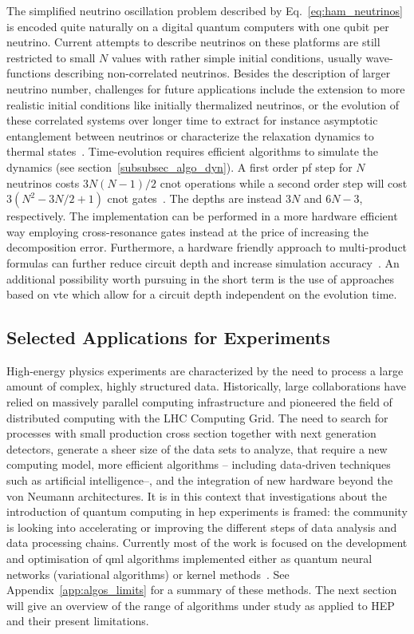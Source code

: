 The simplified neutrino oscillation problem described by Eq.~\eqref{eq:ham_neutrinos} is encoded quite naturally on a digital quantum computers with one qubit per neutrino. Current attempts to describe neutrinos on these platforms are still restricted to small $N$ values with rather simple initial conditions, usually wave-functions describing non-correlated neutrinos. Besides the description of larger neutrino number, challenges for future applications include the extension to more realistic initial conditions like initially thermalized neutrinos, or the evolution of these correlated systems over longer time to extract for instance asymptotic entanglement between neutrinos or characterize the relaxation dynamics to thermal states~\cite{Martin2023}. Time-evolution requires efficient algorithms to simulate the dynamics (see section~\ref{subsubsec_algo_dyn}). A first order \gls{pf} step for $N$ neutrinos costs $3N(N-1)/2$ \gls{cnot} operations while a second order step will cost $3(N^2-3N/2+1)$ \gls{cnot} gates~\cite{Amitrano2022}. The depths are instead $3N$ and $6N-3$, respectively. The implementation can be performed in a more hardware efficient way employing cross-resonance gates instead at the price of increasing the decomposition error. 
Furthermore, a hardware friendly approach to multi-product formulas can further reduce circuit depth and increase simulation accuracy~\cite{Vazquez2022}.
An additional possibility worth pursuing in the short term is the use of approaches based on \gls{vte} which allow for a circuit depth independent on the evolution time.

\subsection{Selected Applications for Experiments}
\label{subsect_Experiments}

High-energy physics experiments are characterized by the need to process a large amount of complex, highly structured data. Historically, large collaborations have relied on massively parallel computing infrastructure and pioneered the field of distributed computing with the LHC Computing Grid.
The need to search for processes with small production cross section together with next generation detectors,  generate a sheer size of the data sets to analyze, that require a new computing model, more efficient algorithms -- including data-driven techniques such as artificial intelligence--, and the integration of new hardware beyond the von Neumann architectures.
It is in this context that investigations about the introduction of quantum computing in \gls{hep} experiments is framed: the community is looking into accelerating or improving the different steps of data analysis and data processing chains.
Currently most of the work is focused on the development and optimisation of \gls{qml} algorithms implemented either as quantum neural networks (variational algorithms) or kernel methods~\cite {guan2021quantum, delgado2022quantum}. See Appendix~\ref{app:algos_limits} for a summary of these methods. The next section will give an overview of the range of algorithms under study as applied to HEP and their present limitations.

